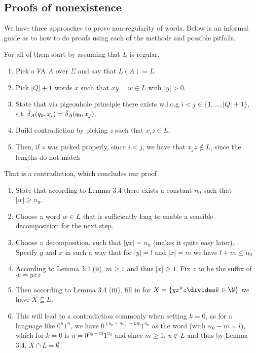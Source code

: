 


\subsection{Proofs of nonexistence}
We have three approaches to prove non-regularity of words.
Below is an informal guide as to how to do proofs using each of the methods and possible pitfalls.

For all of them start by assuming that $L$ is regular.

\rmvspace
\begin{enumerate}[noitemsep]
    \item Pick a FA $A$ over $\Sigma$ and say that $L(A) = L$
    \item Pick $|Q| + 1$ words $x$ such that $xy = w \in L$ with $|y| > 0$.
    \item State that via pigeonhole principle there exists w.l.o.g $i < j \in \{ 1, \ldots, |Q| + 1 \}$, s.t. $\hat{\delta}_A(q_0, x_i) = \hat{\delta}_A(q_0, x_j)$.
    \item Build contradiction by picking $z$ such that $x_i z \in L$.
    \item Then, if $z$ was picked properly, since $i < j$, we have that $x_j z \notin L$, since the lengths do not match
\end{enumerate}

\rmvspace
That is a contradiction, which concludes our proof


\rmvspace
\begin{enumerate}[noitemsep]
    \item State that according to Lemma 3.4 there exists a constant $n_0$ such that $|w| \geq n_0$.
    \item Choose a word $w \in L$ that is sufficiently long to enable a sensible decomposition for the next step.
    \item Choose a decomposition, such that $|yx| = n_0$ (makes it quite easy later). Specify $y$ and $x$ in such a way that for $|y| = l$ and $|x| = m$ we have $l + m \leq n_0$
    \item According to Lemma 3.4 (ii), $m \geq 1$ and thus $|x| \geq 1$. Fix $z$ to be the suffix of $w = yxz$
    \item Then according to Lemma 3.4 (iii), fill in for $X = \{ yx^k z \divides k \in \N \}$ we have $X \subseteq L$.
    \item This will lead to a contradiction commonly when setting $k = 0$, as for a language like $0^n1^n$, we have $0^{(n_0 - m) + km}1^{n_0}$ as the word (with $n_0 - m = l$),
          which for $k = 0$ is $u= 0^{n_0 - m} 1^{n_0}$ and since $m \geq 1$, $u \notin L$ and thus by Lemma 3.4, $X \cap L = \emptyset$
\end{enumerate}


